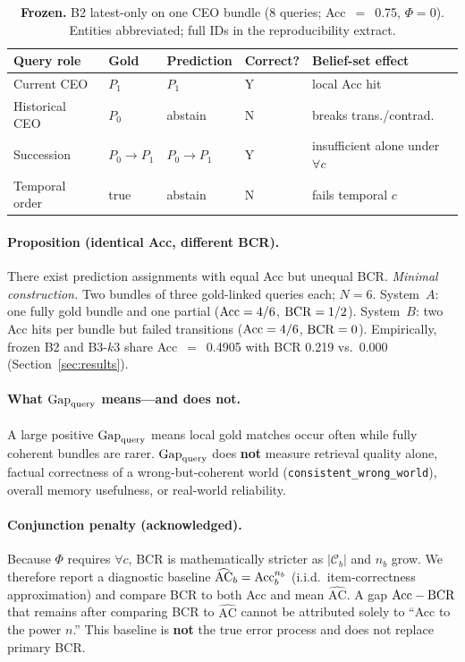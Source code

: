 \begin{table}[t]
\centering
\caption{\textbf{Frozen.} B2 latest-only on one CEO bundle (8 queries; Acc~$=$~0.75, $\Phi{=}0$). Entities abbreviated; full IDs in the reproducibility extract.}
\label{tab:b2vignette}
\small
\setlength{\tabcolsep}{3pt}
\begin{tabular}{llllp{2.4cm}}
\toprule
Query role & Gold & Prediction & Correct? & Belief-set effect \\
\midrule
Current CEO & $P_1$ & $P_1$ & Y & local Acc hit \\
Historical CEO & $P_0$ & abstain & N & breaks trans./contrad. \\
Succession & $P_0\!\to\!P_1$ & $P_0\!\to\!P_1$ & Y & insufficient alone under $\forall c$ \\
Temporal order & true & abstain & N & fails temporal $c$ \\
\bottomrule
\end{tabular}
\end{table}

\paragraph{Proposition (identical Acc, different BCR).}
There exist prediction assignments with equal Acc but unequal BCR.
\emph{Minimal construction.} Two bundles of three gold-linked queries each; $N=6$. System~$A$: one fully gold bundle and one partial ($\mathrm{Acc}=4/6$, $\mathrm{BCR}=1/2$). System~$B$: two Acc hits per bundle but failed transitions ($\mathrm{Acc}=4/6$, $\mathrm{BCR}=0$). Empirically, frozen B2 and B3-$k3$ share Acc~$=$~0.4905 with BCR 0.219 vs.\ 0.000 (Section~\ref{sec:results}).

\paragraph{What $\mathrm{Gap}_{\mathrm{query}}$ means---and does not.}
A large positive $\mathrm{Gap}_{\mathrm{query}}$ means local gold matches occur often while fully coherent bundles are rarer. $\mathrm{Gap}_{\mathrm{query}}$ does \textbf{not} measure retrieval quality alone, factual correctness of a wrong-but-coherent world (\texttt{consistent\_wrong\_world}), overall memory usefulness, or real-world reliability.

\paragraph{Conjunction penalty (acknowledged).}
Because $\Phi$ requires $\forall c$, BCR is mathematically stricter as $|\mathcal{C}_b|$ and $n_b$ grow. We therefore report a diagnostic baseline $\widehat{\mathrm{AC}}_b=\mathrm{Acc}_b^{n_b}$ (i.i.d.\ item-correctness approximation) and compare BCR to both Acc and mean $\widehat{\mathrm{AC}}$. A gap $\mathrm{Acc}-\mathrm{BCR}$ that remains after comparing BCR to $\widehat{\mathrm{AC}}$ cannot be attributed solely to ``Acc to the power $n$.'' This baseline is \textbf{not} the true error process and does not replace primary BCR.

